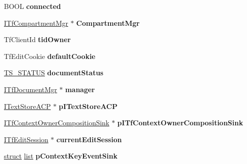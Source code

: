 \begin{DoxyCompactItemize}
B\+O\+OL {\bfseries connected}
\item 
\mbox{\label{structtag_context_a46ff7220bb9b3d9912d2466d1123c77d}} 
\hyperlink{interface_i_tf_compartment_mgr}{I\+Tf\+Compartment\+Mgr} $\ast$ {\bfseries Compartment\+Mgr}
\item 
\mbox{\label{structtag_context_ac3658b135b1c1e52a278d49fd1340198}} 
Tf\+Client\+Id {\bfseries tid\+Owner}
\item 
\mbox{\label{structtag_context_a62355deaea172957ad66ffbe3fd5e190}} 
Tf\+Edit\+Cookie {\bfseries default\+Cookie}
\item 
\mbox{\label{structtag_context_ace67cba43c51f096f208c419ed1f8c02}} 
\hyperlink{struct_t_s___s_t_a_t_u_s}{T\+S\+\_\+\+S\+T\+A\+T\+US} {\bfseries document\+Status}
\item 
\mbox{\label{structtag_context_ad6390c4bdfb878f86f4b1b4dc8a57e6b}} 
\hyperlink{interface_i_tf_document_mgr}{I\+Tf\+Document\+Mgr} $\ast$ {\bfseries manager}
\item 
\mbox{\label{structtag_context_adb69a79c1f85d622afdb9c881e63b98d}} 
\hyperlink{interface_i_text_store_a_c_p}{I\+Text\+Store\+A\+CP} $\ast$ {\bfseries p\+I\+Text\+Store\+A\+CP}
\item 
\mbox{\label{structtag_context_aa5f95d9c3cd179c92e52be2f8e1e6852}} 
\hyperlink{interface_i_tf_context_owner_composition_sink}{I\+Tf\+Context\+Owner\+Composition\+Sink} $\ast$ {\bfseries p\+I\+Tf\+Context\+Owner\+Composition\+Sink}
\item 
\mbox{\label{structtag_context_a6d1f9aa0d649faf1d346bc491d6bdb86}} 
\hyperlink{interface_i_tf_edit_session}{I\+Tf\+Edit\+Session} $\ast$ {\bfseries current\+Edit\+Session}
\item 
\mbox{\label{structtag_context_a1cc2995310ff7e72b0dbade500c2291f}} 
\hyperlink{interfacestruct}{struct} \hyperlink{classlist}{list} {\bfseries p\+Context\+Key\+Event\+Sink}
\item 
\mbox{\label{structtag_context_a8ef2d38f296fd28eadd274517bc51752}} 

\end{DoxyCompactItemize}
